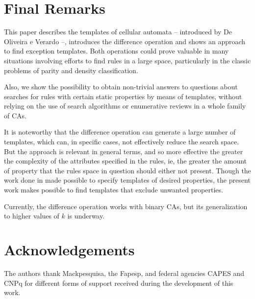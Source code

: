 \documentclass{llncs}
\begin{document}
\section{Final Remarks}
\label{sec:consideracoes_finais}
This paper describes the templates of cellular automata -- introduced by De Oliveira e Verardo \cite{deOliveira2014,deOliveira2014b} --, introduces the difference operation and shows an approach to find exception templates. %
 Both operations could prove valuable in many situations involving efforts to find rules in a large space, particularly in the classic problems of parity and density classification.

Also, we show the possibility to obtain non-trivial answers to questions about searches for rules with certain static properties by means of templates, without relying on the use of search algorithms or enumerative reviews in a whole family of CAs.

It is noteworthy that the difference operation can generate a large number of templates, which can, in specific cases, not effectively reduce the search space. But the approach is relevant in general terms, and so more effective the greater the complexity of the attributes specified in the rules, ie, the greater the amount of property that the rules space in question should either not present. 
Though the work done in \cite{deOliveira2014,deOliveira2014b} made possible to specify templates of desired properties, the present work makes possible to find templates that exclude unwanted properties.

Currently, the difference operation works with binary CAs, but its generalization to higher values of $k$ is underway.

\section*{Acknowledgements}
\label{sec:agrdecimentos}
The authors thank Mackpesquisa, the Fapesp, and federal agencies CAPES and CNPq for different forms of support received during the development of this work.



\end{document}
